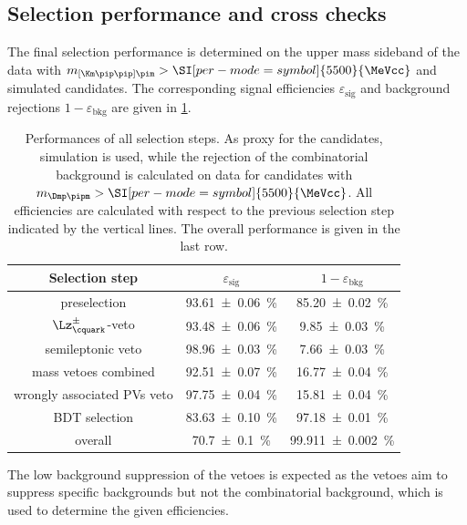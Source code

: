 \subsection{Selection performance and cross checks}
\label{sec:selectionPerformance}

The final selection performance is determined on the upper mass sideband of the data with \mbox{$m_{\left[\Km\pip\pip\right]\pim}>\SI[per-mode=symbol]{5500}{\MeVcc}$} and simulated \BdToDpi candidates.
The corresponding signal efficiencies $\varepsilon_{\text{sig}}$ and background rejections $1-\varepsilon_{\text{bkg}}$ are given in \cref{tab:selPerform}.
\begin{table}[tbp]
	\centering
	\caption{Performances of all selection steps.
	As proxy for the \BdToDpi candidates, simulation is used, while the rejection of the combinatorial background is calculated on data for candidates with $m_{\Dmp\pipm}>\SI[per-mode=symbol]{5500}{\MeVcc}$.
	All efficiencies are calculated with respect to the previous selection step indicated by the vertical lines.
	The overall performance is given in the last row.}
	\begin{tabular}{ccc}
		\toprule
		Selection step						& $\varepsilon_{\text{sig}}$  & $1-\varepsilon_{\text{bkg}}$ \\
		\midrule
		preselection						& \SI{93.61\pm0.06}{\percent} & \SI{85.20\pm0.02}{\percent} \\
		\midrule
		$\Lz^\pm_\cquark$-veto				& \SI{93.48\pm0.06}{\percent} & \SI{9.85\pm0.03}{\percent} \\
		semileptonic veto					& \SI{98.96\pm0.03}{\percent} & \SI{7.66\pm0.03}{\percent} \\
		mass vetoes combined				& \SI{92.51\pm0.07}{\percent} & \SI{16.77\pm0.04}{\percent} \\
		\midrule
		wrongly associated \ac{PV}s veto	& \SI{97.75\pm0.04}{\percent} & \SI{15.81\pm0.04}{\percent} \\
		BDT selection						& \SI{83.63\pm0.10}{\percent} & \SI{97.18\pm0.01}{\percent} \\
		\midrule
		overall								& \SI{70.7\pm0.1}{\percent}   & \SI{99.911\pm0.002}{\percent} \\
		\bottomrule
	\end{tabular}
	\label{tab:selPerform}
\end{table}
The low background suppression of the vetoes is expected as the vetoes aim to suppress specific backgrounds but not the combinatorial background, which is used to determine the given efficiencies.

